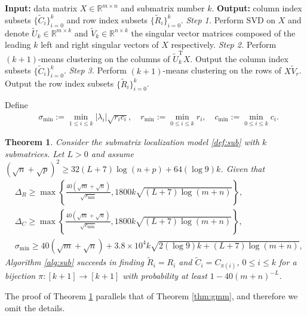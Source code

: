 \documentclass[reqno]{amsart}
\newcommand{\T}{\mathrm{T}}
\theoremstyle{plain}
\newtheorem{theorem}{Theorem}
\theoremstyle{definition}
\begin{document}
\begin{algorithm}
    \caption{Spectral algorithm for submatrix localization}
    \label{alg:sub}
    \begin{algorithmic}
   \State \textbf{Input:} data matrix $X \in \mathbb R^{m\times n}$ and submatrix number $k$.
     \State \textbf{Output:} column index subsets $\{ \widetilde C_i\}_{i=0}^k$ and row index subsets $\{\widetilde R_i\}_{i=0}^k$.
    \State  \emph{Step 1.} Perform SVD on $X$ and denote $\widetilde U_k \in \mathbb R^{m\times k}$ and $\widetilde V_k \in \mathbb R^{n\times k}$ the singular vector matrices composed of the leading $k$ left and right singular vectors of $X$ respectively.
    \State \emph{Step 2.} Perform $(k+1)$-means clustering on the columns of $\widetilde U_k^\T X$. Output the column index subsets $\{ \widetilde C_i\}_{i=0}^k$.
     \State \emph{Step 3.} Perform $(k+1)$-means clustering on the rows of $X \widetilde V_r$. Output the row index subsets $\{ \widetilde R_i\}_{i=0}^k$.
    \end{algorithmic}
\end{algorithm}

Define 
\begin{align*}
&\sigma_{\min}:= \min_{1\le i \le k} |\lambda_i| \sqrt{r_i c_i}, \quad r_{\min} := \min_{0\le i \le k} r_i, \quad c_{\min}:=\min_{0\le i \le k} c_i. 
\end{align*}

\begin{theorem}\label{thm:sub}Consider the submatrix localization model \eqref{def:sub} with $k$ submatrices. Let $L>0$ and assume $(\sqrt n + \sqrt p)^2 \ge 32(L+7) \log(n+p) + 64(\log 9) k$. Given that
\begin{align*}
&\Delta_R \ge \max\left\{ \frac{40(\sqrt m + \sqrt n)}{\sqrt{r_{\min}}}, 1800k\sqrt{(L+7)\log(m+n)} \right\},\\
&\Delta_C \ge \max\left\{ \frac{40(\sqrt m + \sqrt n)}{\sqrt{c_{\min}}}, 1800k\sqrt{(L+7)\log(m+n)}  \right\},\\
&\sigma_{\min} \ge 40(\sqrt m + \sqrt n)+ 3.8\times 10^4 k \sqrt{2(\log 9)  k + (L+7)\log(m+n)},
\end{align*}
Algorithm \ref{alg:sub} succeeds in finding $\widetilde R_i = R_i$ and $\widetilde C_i = C_{\pi(i)}$, $0\le i \le k$ for a bijection $\pi:[k+1]\to[k+1]$ with probability at least $1-40(m+n)^{-L}$.
\end{theorem}
The proof of Theorem \ref{thm:sub} parallels that of Theorem \ref{thm:gmm}, and therefore we omit the details. 
\end{document}
